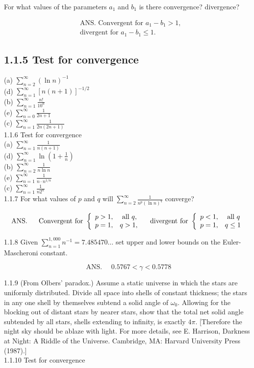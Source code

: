\documentclass[10pt]{article}
\begin{document}
For what values of the parameters $a_{1}$ and $b_{1}$ is there convergence? divergence?

$$
\begin{aligned}
& \text { ANS. Convergent for } a_{1}-b_{1}>1 \text {, } \\
& \text { divergent for } a_{1}-b_{1} \leq 1 \text {. }
\end{aligned}
$$

\subsection*{1.1.5 Test for convergence}
(a) $\sum_{n=2}^{\infty}(\ln n)^{-1}$\\
(d) $\sum_{n=1}^{\infty}[n(n+1)]^{-1 / 2}$\\
(b) $\sum_{n=1}^{\infty} \frac{n!}{10^{n}}$\\
(e) $\sum_{n=0}^{\infty} \frac{1}{2 n+1}$\\
(c) $\sum_{n=1}^{\infty} \frac{1}{2 n(2 n+1)}$\\
1.1.6 Test for convergence\\
(a) $\sum_{n=1}^{\infty} \frac{1}{n(n+1)}$\\
(d) $\sum_{n=1}^{\infty} \ln \left(1+\frac{1}{n}\right)$\\
(b) $\sum_{n=2}^{\infty} \frac{1}{n \ln n}$\\
(e) $\sum_{n=1}^{\infty} \frac{1}{n \cdot n^{1 / n}}$\\
(c) $\sum_{n=1}^{\infty} \frac{1}{n 2^{n}}$\\
1.1.7 For what values of $p$ and $q$ will $\sum_{n=2}^{\infty} \frac{1}{n^{p}(\ln n)^{q}}$ converge?

$$
\text { ANS. } \quad \text { Convergent for }\left\{\begin{array} { l l } 
{ p > 1 , } & { \text { all } q , } \\
{ p = 1 , } & { q > 1 , }
\end{array} \quad \text { divergent for } \left\{\begin{array}{ll}
p<1, & \text { all } q \\
p=1, & q \leq 1
\end{array}\right.\right.
$$

1.1.8 Given $\sum_{n=1}^{1,000} n^{-1}=7.485470 \ldots$ set upper and lower bounds on the Euler-Mascheroni constant.

$$
\text { ANS. } \quad 0.5767<\gamma<0.5778
$$

1.1.9 (From Olbers' paradox.) Assume a static universe in which the stars are uniformly distributed. Divide all space into shells of constant thickness; the stars in any one shell by themselves subtend a solid angle of $\omega_{0}$. Allowing for the blocking out of distant stars by nearer stars, show that the total net solid angle subtended by all stars, shells extending to infinity, is exactly $4 \pi$. [Therefore the night sky should be ablaze with light. For more details, see E. Harrison, Darkness at Night: A Riddle of the Universe. Cambridge, MA: Harvard University Press (1987).]\\
1.1.10 Test for convergence
\end{document}
